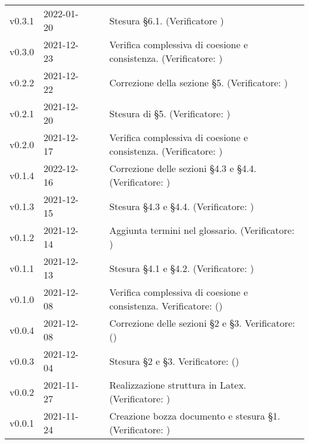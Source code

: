 \begin{longtable}{ m{}<{\centering}  m{}<{\centering}  m{}<{\centering}  m{}<{\centering}  m{}<{\centering} }
	v0.3.1& 2022-01-20 & \EP{} & \AM{} & Stesura §6.1. (Verificatore \textit{\MG}) \\

	v0.3.0& 2021-12-23 & \EP{} & \AM {} & Verifica complessiva di coesione e consistenza. (Verificatore: \textit{\MG})\\	

	v0.2.2& 2021-12-22 & \EP{} & \AM{} & Correzione della sezione §5. (Verificatore: \textit{\MG})\\
	
	v0.2.1& 2021-12-20 & \EP{} & \AM{} & Stesura di §5. (Verificatore: \textit{\MG})\\

	v0.2.0& 2021-12-17 & \EP{} & \AM{} & Verifica complessiva di coesione e consistenza. (Verificatore: \textit{\MG})\\	
	
	v0.1.4& 2022-12-16 & \MB{} & \AM{} & Correzione delle sezioni §4.3 e §4.4. (Verificatore: \textit{\MG})\\
	
	v0.1.3& 2021-12-15 & \MB{} & \AM{} & Stesura §4.3 e §4.4. (Verificatore: \textit{\MG})\\

	v0.1.2& 2021-12-14 & \EP{} & \AM{} & Aggiunta termini nel glossario. (Verificatore: \textit{\MG})\\

	v0.1.1& 2021-12-13 & \MB{} & \AM{} & Stesura §4.1 e §4.2. (Verificatore: \textit{\MG})\\

	v0.1.0& 2021-12-08 & \MB{} & \AM{} & Verifica complessiva di coesione e consistenza. Verificatore: (\textit{\FP}) \\	

	v0.0.4& 2021-12-08 & \MB{} & \AM{} & Correzione delle sezioni §2 e §3. Verificatore: (\textit{\FP}) \\

	v0.0.3& 2021-12-04 & \MB{} & \AM{} & Stesura §2 e §3. Verificatore: (\textit{\FP}) \\

	v0.0.2& 2021-11-27 & \EP{} & \AM{} & Realizzazione struttura in Latex. (Verificatore: \textit{\FP})\\

	v0.0.1& 2021-11-24 & \MB{} & \RE{} & Creazione bozza documento e stesura §1. (Verificatore: \textit{\FP}) \\

\end{longtable}

\pagebreak
